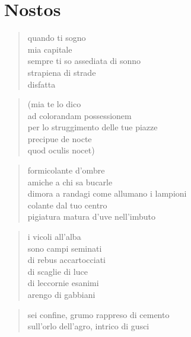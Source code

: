 \chapter*{Nostos}


\begin{verse}
    quando ti sogno\\
    mia capitale\\
    sempre ti so assediata di sonno\\
    strapiena di strade\\
    disfatta
\end{verse}

\begin{verse}
    (mia te lo dico\\
    ad colorandam possessionem\\
    per lo struggimento delle tue piazze\\
    precipue de nocte\\
    quod oculis nocet)
\end{verse}

\begin{verse}
    formicolante d'ombre\\
    amiche a chi sa bucarle\\
    dimora a randagi come allumano i lampioni\\
    colante dal tuo centro\\
    pigiatura matura d'uve nell'imbuto
\end{verse}

\clearpage


\begin{verse}
    i vicoli all'alba\\
    sono campi seminati\\
    di rebus accartocciati\\
    di scaglie di luce\\
    di leccornie esanimi\\
    arengo di gabbiani
\end{verse}

\clearpage


\begin{verse}
    sei confine, grumo rappreso di cemento\\
    sull'orlo dell'agro, intrico di gusci
\end{verse}


